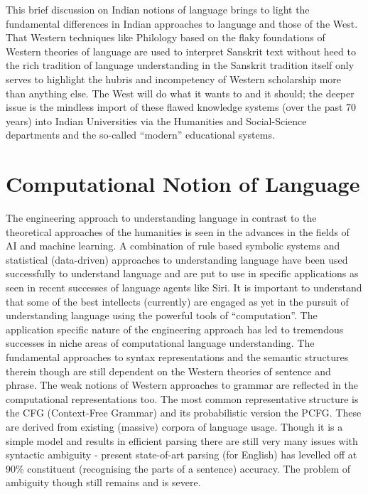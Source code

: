 This brief discussion on Indian notions of language brings to light the fundamental differences in Indian approaches to language and those of the West. That Western techniques like Philology based on the flaky foundations of Western theories of language are used to interpret Sanskrit text without heed to the rich tradition of language understanding in the Sanskrit tradition itself only serves to highlight the hubris and incompetency of Western scholarship more than anything else. The West will do what it wants to and it should; the deeper issue is the mindless import of these flawed knowledge systems (over the past 70 years) into Indian Universities via the Humanities and Social-Science departments and the so-called “modern” educational systems.


\section*{Computational Notion of Language}

\vskip -6pt

The engineering approach to understanding language in contrast to the theoretical approaches of the humanities is seen in the advances in the fields of AI and machine learning. A combination of rule based symbolic systems and statistical (data-driven) approaches to understanding language have been used successfully to understand language and are put to use in specific applications as seen in recent successes of language agents like Siri. It is important to understand that some of the best intellects (currently) are engaged as yet in the pursuit of understanding language using the powerful tools of “computation”. The application specific nature of the engineering approach has led to tremendous successes in niche areas of computational language understanding. The fundamental approaches to syntax representations and the semantic structures therein though are still dependent on the Western theories of sentence and phrase. The weak notions of Western approaches to grammar are reflected in the computational representations too. The most common representative structure is the CFG (Context-Free Grammar) and its probabilistic version the PCFG. These are derived from existing (massive) corpora of language usage. Though it is a simple model and results in efficient parsing there are still very many issues with syntactic ambiguity - present state-of-art parsing (for English) has levelled off at 90\% constituent (recognising the parts of a sentence) accuracy. The problem of ambiguity though still remains and is severe.

